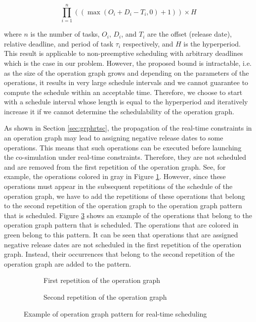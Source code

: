 \begin{equation} 
\prod_{i=1}^n((\max(O_i + D_i - T_i, 0) + 1)) \times H
\end{equation}

where $n$ is the number of tasks, $O_i$, $D_i$, and $T_i$ are the offset (release date), relative deadline, and period of task $\tau_i$ respectively, and $H$ is the hyperperiod. This result is applicable to non-preemptive scheduling with arbitrary deadlines which is the case in our problem. However, the proposed bound is intractable, i.e. as the size of the operation graph grows and depending on the parameters of the operations, it results in very large schedule intervals and we cannot guarantee to compute the schedule within an acceptable time. Therefore, we choose to start with a schedule interval whose length is equal to the hyperperiod and iteratively increase it if we cannot determine the schedulability of the operation graph.


As shown in Section \ref{sec:grphrtsc}, the propagation of the real-time constraints in an operation graph may lead to assigning negative release dates to some operations. This means that such operations can be executed before launching the co-simulation under real-time constraints. Therefore, they are not scheduled and are removed from the first repetition of the operation graph. See, for example, the operations colored in gray in Figure \ref{fig:rep1}. However, since these operations must appear in the subsequent repetitions of the schedule of the operation graph, we have to add the repetitions of these operations that belong to the second repetition of the operation graph to the operation graph pattern that is scheduled. Figure \ref{fig:schedpattern} shows an example of the operations that belong to the operation graph pattern that is scheduled. The operations that are colored in green belong to this pattern. It can be seen that operations that are assigned negative release dates are not scheduled in the first repetition of the operation graph. Instead, their occurrences that belong to the second repetition of the operation graph are added to the pattern.

\begin{figure}[phtb]
\centering
\begin{subfigure}{\textwidth}
  \centering
  
  \caption{First repetition of the operation graph}
  \label{fig:rep1}
\end{subfigure}

\begin{subfigure}{\textwidth}
  \centering
  
  \caption{Second repetition of the operation graph}
  \label{fig:rep2}
\end{subfigure}
\caption{Example of operation graph pattern for real-time scheduling}
\label{fig:schedpattern}
\end{figure}

